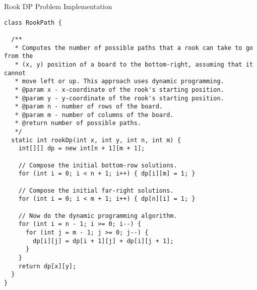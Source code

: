 \begin{cl}[]{Rook DP Problem Implementation}
\begin{lstlisting}[language=MyJava]
class RookPath {

  /**
   * Computes the number of possible paths that a rook can take to go from the
   * (x, y) position of a board to the bottom-right, assuming that it cannot
   * move left or up. This approach uses dynamic programming.
   * @param x - x-coordinate of the rook's starting position.
   * @param y - y-coordinate of the rook's starting position.
   * @param n - number of rows of the board.
   * @param m - number of columns of the board.
   * @return number of possible paths.
   */
  static int rookDp(int x, int y, int n, int m) {
    int[][] dp = new int[n + 1][m + 1];

    // Compose the initial bottom-row solutions.
    for (int i = 0; i < n + 1; i++) { dp[i][m] = 1; }

    // Compose the initial far-right solutions.
    for (int i = 0; i < m + 1; i++) { dp[n][i] = 1; }

    // Now do the dynamic programming algorithm.
    for (int i = n - 1; i >= 0; i--) {
      for (int j = m - 1; j >= 0; j--) {
        dp[i][j] = dp[i + 1][j] + dp[i][j + 1];
      }
    }
    return dp[x][y];
  }
}
\end{lstlisting}
\end{cl}